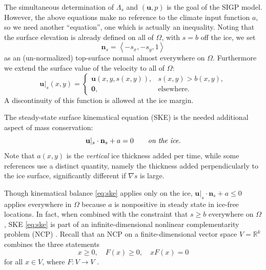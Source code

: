 \documentclass[letterpaper,final,12pt,reqno]{amsart}
\theoremstyle{claim}
\newcommand{\RR}{\mathbb{R}}
\newcommand{\grad}{\nabla}
\newcommand{\bn}{\mathbf{n}}
\newcommand{\bu}{\mathbf{u}}
\newcommand{\bzero}{\bm{0}}
\newcommand{\bus}{\bu|_s}
\numberwithin{equation}{section}
\numberwithin{figure}{section}
\numberwithin{table}{section}
\numberwithin{theorem}{section}
\begin{document}
The simultaneous determination of $\Lambda_s$ and $(\bu,p)$ is the goal of the SIGP model.  However, the above equations make no reference to the climate input function $a$, so we need another ``equation'', one which is actually an inequality.  Noting that the surface elevation is already defined on all of $\Omega$, with $s=b$ off the ice, we set
\begin{equation}
\bn_s = \left<-s_x,-s_y,1\right> \label{eq:surfacenormal}
\end{equation}
as an (un-normalized) top-surface normal almost everywhere on $\Omega$.  Furthermore we extend the surface value of the velocity to all of $\Omega$:
\begin{equation}
\bus(x,y) = \begin{cases} \bu(x,y,s(x,y)), & s(x,y) > b(x,y), \\
                     \bzero, & \text{elsewhere}. \end{cases} \label{eq:surfacevelocity}
\end{equation}
A discontinuity of this function is allowed at the ice margin.

The steady-state surface kinematical equation (SKE) \cite[equation (5.21)]{GreveBlatter2009} is the needed additional aspect of mass conservation:
\begin{equation}
\bus \cdot \bn_s + a = 0 \qquad \text{\emph{on the ice}}. \label{eq:ske}
\end{equation}
Note that $a(x,y)$ is the \emph{vertical} ice thickness added per time, while some references use a distinct quantity, namely the thickness added perpendicularly to the ice surface, significantly different if $\grad s$ is large.

Though kinematical balance \eqref{eq:ske} applies only on the ice, $\bus \cdot \bn_s + a \le 0$ applies everywhere in $\Omega$ because $a$ is nonpositive in steady state in ice-free locations.  In fact, when combined with the constraint that $s\ge b$ everywhere on $\Omega$, SKE \eqref{eq:ske} is part of an infinite-dimensional nonlinear complementarity problem (NCP) \cite{Bueler2021conservation}.  Recall that an NCP on a finite-dimensional vector space $V=\RR^k$ combines the three statements
\begin{equation}
x\ge 0, \quad F(x)\ge 0, \quad x F(x)=0 \label{eq:ncp}
\end{equation}
for all $x\in V$, where $F:V\to V$ \cite{FacchineiPang2003}.
\end{document}

